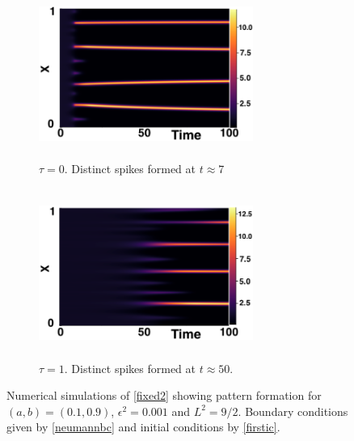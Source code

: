 \begin{figure}[H]
    \centering
    \begin{subfigure}[t]{0.45\textwidth}
        \centering
        \includegraphics[width=7cm,height = 5.5cm]{patt1.png}
        \caption{$\tau=0$. Distinct spikes formed at $t\approx7$ }
        \label{}
    \end{subfigure}
    \hfill
    \begin{subfigure}[t]{0.45\textwidth}
        \centering
        \includegraphics[width=7cm,height = 5.5cm]{patt2.png}
        \caption{$\tau=1$. Distinct spikes formed at $t\approx50$.}
        \label{}
    \end{subfigure}
    \caption{Numerical simulations of \eqref{fixed2} showing pattern formation for $(a,b)=(0.1,0.9)$, $\epsilon^2=0.001$ and $L^2=9/2$. Boundary conditions given by \eqref{neumannbc} and initial conditions by \eqref{firstic}.}
    \label{fig:fixedsim2}
\end{figure}

